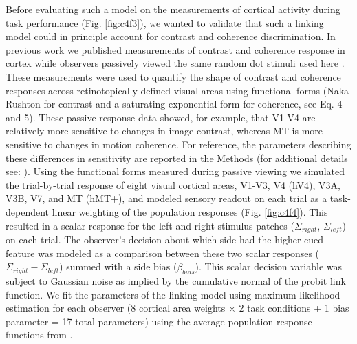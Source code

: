 \documentclass{report}
\begin{document}
Before evaluating such a model on the measurements of cortical activity during task performance (Fig. \ref{fig:c4f3}), we wanted to validate that such a linking model could in principle account for contrast and coherence discrimination. In previous work we published measurements of contrast and coherence response in cortex while observers passively viewed the same random dot stimuli used here \citep{Birman2018-sp}. These measurements were used to quantify the shape of contrast and coherence responses across retinotopically defined visual areas using functional forms (Naka-Rushton for contrast and a saturating exponential form for coherence, see Eq. 4 and 5). These passive-response data showed, for example, that V1-V4 are relatively more sensitive to changes in image contrast, whereas MT is more sensitive to changes in motion coherence. For reference, the parameters describing these differences in sensitivity are reported in the Methods (for additional details see: \citet{Birman2018-sp}). Using the functional forms measured during passive viewing we simulated the trial-by-trial response of eight visual cortical areas, V1-V3, V4 (hV4), V3A, V3B, V7, and MT (hMT+), and modeled sensory readout on each trial as a task-dependent linear weighting of the population responses (Fig. \ref{fig:c4f4}). This resulted in a scalar response for the left and right stimulus patches ($\Sigma_{right}$, $\Sigma_{left}$) on each trial. The observer’s decision about which side had the higher cued feature was modeled as a comparison between these two scalar responses ($\Sigma_{right}-\Sigma_{left}$) summed with a side bias ($\beta_{bias}$). This scalar decision variable was subject to Gaussian noise as implied by the cumulative normal of the probit link function. We fit the parameters of the linking model using maximum likelihood estimation for each observer (8 cortical area weights $\times$ 2 task conditions + 1 bias parameter = 17 total parameters) using the average population response functions from \citet{Birman2018-sp}. 
\end{document}
